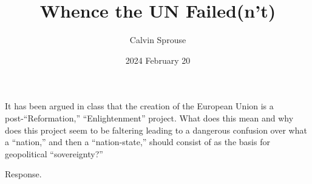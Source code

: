 \documentclass[a4paper, 12pt]{article}
\title{Whence the UN Failed(n't)}
\author{Calvin Sprouse}
\affil{Geography 101 World Regional Geography}
\date{2024 February 20}
\begin{document}
\maketitle


\doublespacing\noindent
It has been argued in class that the creation of the European Union is a post-``Reformation,'' ``Enlightenment'' project. What does this mean and why does this project seem to be faltering leading to a dangerous confusion over what a ``nation,'' and then a ``nation-state,'' should consist of as the basis for geopolitical ``sovereignty?''
\vspace*{1\baselineskip}

Response.
\end{document}

